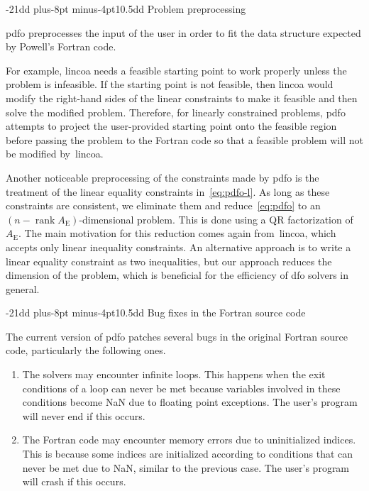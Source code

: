 \documentclass[smallextended,final]{svjour3}
\makeatletter
\DeclareMathOperator{\rank}{rank}
\newcommand{\aeq}{A_{\scriptscriptstyle\text{E}}}
\def\subsection{\@startsection{subsection}{2}{\z@}%
    {-21dd plus-8pt minus-4pt}{10.5dd}
    {\normalsize\bfseries}}
\makeatother
\begin{document}
\subsection{Problem preprocessing}
\label{subsec:pdfo-preprocessing}

\Gls{pdfo} preprocesses the input of the user in order to fit the data structure expected by Powell's Fortran code.

For example, \gls{lincoa} needs a feasible starting point to work properly unless the problem is infeasible.
If the starting point is not feasible, then \gls{lincoa} would modify the right-hand sides of the linear constraints to make it feasible and then solve the modified problem.
Therefore, for linearly constrained problems, \gls{pdfo} attempts to project the user-provided starting point onto the feasible region before passing the problem to the Fortran code so that a feasible problem will not be modified by~\gls{lincoa}.

Another noticeable preprocessing of the constraints made by \gls{pdfo} is the treatment of the linear equality constraints in~\eqref{eq:pdfo-l}.
As long as these constraints are consistent, we eliminate them and reduce~\eqref{eq:pdfo} to an~$(n - \rank \aeq)$-dimensional problem.
This is done using a QR factorization of~$\aeq$.
The main motivation for this reduction comes again from~\gls{lincoa}, which accepts only linear inequality constraints.
An alternative approach is to write a linear equality constraint as two inequalities, but our approach reduces the dimension of the problem, which is beneficial for the efficiency of \gls{dfo} solvers in general.

\subsection{Bug fixes in the Fortran source code}
\label{subsec:bug-corrections}

The current version of \gls{pdfo} patches several bugs in the original Fortran source code, particularly the following ones.
\begin{enumerate}
    \item The solvers may encounter infinite loops.
        This happens when the exit conditions of a loop can never be met because variables involved in these conditions become NaN due to floating point exceptions.
        The user's program will never end if this occurs.
    \item The Fortran code may encounter memory errors due to uninitialized indices.
        This is because some indices are initialized according to conditions that can never be met due to NaN, similar to the previous case.
        The user's program will crash if this occurs.
\end{enumerate}
\end{document}
